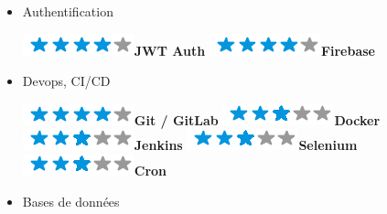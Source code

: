 \documentclass[]{friggeri-cv}
\begin{document}
\begin{flushleft}
\begin{multicols}{3}
\begin{itemize}
\item \large Authentification \
\normalsize
\begin{flushleft}

\includegraphics[scale=0.40]{res/img/4stars.png}\hspace{1.5mm}\textbf{JWT Auth}
\includegraphics[scale=0.40]{res/img/4stars.png}\hspace{1.5mm}\textbf{Firebase}
\end{flushleft}            

\item \large Devops, CI/CD \
\normalsize
\begin{flushleft}

\includegraphics[scale=0.40]{res/img/4stars.png}\hspace{1.5mm}\textbf{Git / GitLab}
\includegraphics[scale=0.40]{res/img/3stars.png}\hspace{1.5mm}\textbf{Docker}
\includegraphics[scale=0.40]{res/img/3stars.png}\hspace{1.5mm}\textbf{Jenkins}
\includegraphics[scale=0.40]{res/img/3stars.png}\hspace{1.5mm}\textbf{Selenium}
\includegraphics[scale=0.40]{res/img/3stars.png}\hspace{1.5mm}\textbf{Cron}
\end{flushleft}            

\columnbreak
\item \large Bases de données \
\normalsize
\begin{flushleft}


\end{flushleft}
\end{itemize}
\end{multicols}
\end{flushleft}
\end{document}
